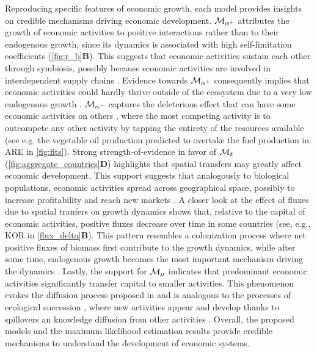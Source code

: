 Reproducing specific features of economic growth, each model provides insights on credible mechanisms driving economic development.
% 
$\mathcal{M}_{\alpha^+}$ attributes the growth of economic activities to positive interactions rather than to their endogenous growth, since its dynamics is associated with high self-limitation coefficients (\cref{fig:r_b}\textbf{B}). This suggests that economic activities sustain each other through symbiosis, possibly because economic activities are involved in interdependent supply chains \citep{Ozman2009,Saavedra2009a}. Evidence towards $\mathcal{M}_{\alpha^+}$ consequently implies that economic activities could hardly thrive outside of the ecosystem due to a very low endogenous growth \citep{Yukalov2012}.
% 
$\mathcal{M}_{\alpha^-}$ captures the deleterious effect that can have some economic activities on others \citep{Wernerfelt1989}, where the most competing activity is to outcompete any other activity by tapping the entirety of the resources available (see e.g. the vegetable oil production predicted to overtake the fuel production in ARE in \cref{fig:fits}).
% 
Strong strength-of-evidence in favor of $\mathcal{M}_\delta$ (\cref{fig:aggregate_countries}\textbf{D}) highlights that spatial transfers may greatly affect economic development. This support suggests that analogously to biological populations, economic activities spread across geographical space, possibly to increase profitability and reach new markets \citep{Luo2007}.
% 
A closer look at the effect of fluxes due to spatial tranfers on growth dynamics shows that, relative to the capital of economic activities, positive fluxes decrease over time in some countries (see, e.g., KOR in \cref{flux_delta}\textbf{B}). This pattern resembles a colonization process where net positive fluxes of biomass first contribute to the growth dynamics, while after some time, endogenous growth becomes the most important mechanism driving the dynamics \citep{Leibold2004}. 
%
Lastly, the support for $\mathcal{M}_\mu$ indicates that predominant economic activities significantly transfer capital to smaller activities. This phenomenon evokes the diffusion process proposed in \citep{C.A.HidalgoB.Klinger} and is analogous to the processes of ecological succession \citep{Odum1969}, where new activities appear and develop thanks to spillovers an knowledge diffusion from other activities \citep{}.
% 
Overall, the proposed models and the maximum likelihood estimation results provide credible mechanisms to understand the development of economic systems.

